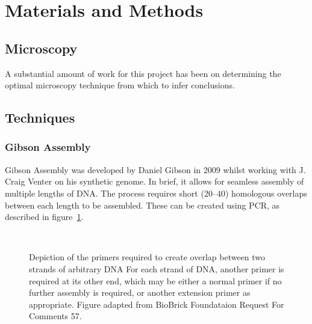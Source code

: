\documentclass[../main.tex]{subfiles}
\begin{document}
\section{Materials and Methods}

\subsection{Microscopy}

A substantial amount of work for this project has been on determining the optimal microscopy technique from which to infer conclusions.

\subsection{Techniques}

\subsubsection{Gibson Assembly}

Gibson Assembly was developed by Daniel Gibson\cite{gibson9} in 2009 whilst working with J. Craig Venter on his synthetic genome\cite{venter10}. In brief, it allows for seamless assembly of multiple lengths of DNA. The process requires short (\SIrange{20}{40}{\base}) homologous overlaps between each length to be assembled. These can be created using PCR, as described in figure~\ref{fig:gibsonPCR}.
\begin{figure}
\\
\caption{Depiction of the primers required to create overlap between two strands of arbitrary DNA For each strand of DNA, another primer is required at its other end, which may be either a normal primer if no further assembly is required, or another extension primer as appropriate. Figure adapted from BioBrick Foundataion Request For Comments 57\cite{rfc57}.}
\label{fig:gibsonPCR}
\end{figure}
\end{document}
